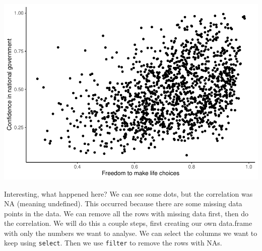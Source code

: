 \documentclass[
]{book}
\newenvironment{Shaded}{\begin{snugshade}}{\end{snugshade}}
\newcommand{\AttributeTok}[1]{\textcolor[rgb]{0.13,0.29,0.53}{#1}}
\newcommand{\FunctionTok}[1]{\textcolor[rgb]{0.13,0.29,0.53}{\textbf{#1}}}
\newcommand{\NormalTok}[1]{#1}
\newcommand{\OtherTok}[1]{\textcolor[rgb]{0.56,0.35,0.01}{#1}}
\newcommand{\SpecialCharTok}[1]{\textcolor[rgb]{0.81,0.36,0.00}{\textbf{#1}}}
\newcommand{\StringTok}[1]{\textcolor[rgb]{0.31,0.60,0.02}{#1}}
\begin{document}
\includegraphics{Statistics_Lab_files/figure-latex/unnamed-chunk-288-1.pdf}

Interesting, what happened here? We can see some dots, but the correlation was NA (meaning undefined). This occurred because there are some missing data points in the data. We can remove all the rows with missing data first, then do the correlation. We will do this a couple steps, first creating our own data.frame with only the numbers we want to analyse. We can select the columns we want to keep using \texttt{select}. Then we use \texttt{filter} to remove the rows with NAs.

\begin{Shaded}
\end{Shaded}
\end{document}
